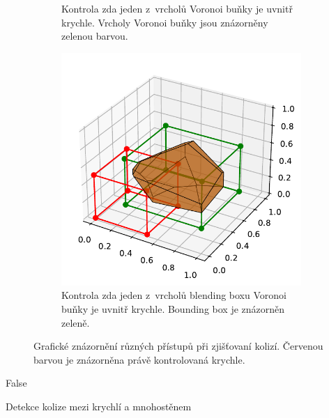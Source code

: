 \begin{figure}
\begin{subfigure}[t]{0.29\columnwidth}
    \caption{Kontrola zda jeden z~vrcholů Voronoi buňky je uvnitř krychle. Vrcholy Voronoi buňky jsou znázorněny zelenou barvou.}
    \label{fig:colision_approx_vertex}
\end{subfigure}
\hfill
\begin{subfigure}[t]{0.29\columnwidth}
    \includegraphics[scale=0.5]{obrazky-figures/hashtree/bouding_box.pdf}
    \caption{Kontrola zda jeden z~vrcholů blending boxu Voronoi buňky je uvnitř krychle. Bounding box je znázorněn zeleně.}
    \label{fig:colision_approx_bb}
    
\end{subfigure}

    \caption{Grafické znázornění různých přístupů při zjišťovaní kolizí. Červenou barvou je znázorněna právě kontrolovaná krychle.}
    \label{fig:colision_approx}

\end{figure}


\begin{algorithm}
    \SetAlgoLined
    
    


        \Return False\;

    
    \caption{Detekce kolize mezi krychlí a mnohostěnem}
    \label{algo:detection-polyhedron}
\end{algorithm}


